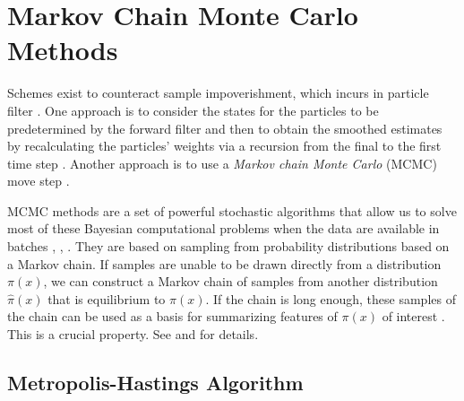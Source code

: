 \section{Markov Chain Monte Carlo Methods}


Schemes exist to counteract sample impoverishment, which incurs in particle filter \cite{ristic2004beyond}. One approach is to consider the states for the particles to be predetermined by the forward filter and then to obtain the smoothed estimates by recalculating the particles' weights via a recursion from the final to the first time step \cite{godsill2000methodology}. Another approach is to use a \textit{Markov chain Monte Carlo} (MCMC) move step \cite{carlin1992monte}.


MCMC methods are a set of powerful stochastic algorithms that allow us to solve most of these Bayesian computational problems when the data are available in batches \cite{andrieu1999sequential}, \cite{green1995reversible}, \cite{andrieu2001model}. They are based on sampling from probability distributions based on a Markov chain. If samples are unable to be drawn directly from a distribution $\pi(x)$, we can construct a Markov chain of samples from another distribution $\hat{\pi}(x)$ that is equilibrium to $\pi(x)$. If the chain is long enough, these samples of the chain can be used as a basis for summarizing features of $\pi(x)$ of interest \cite{smith1993bayesian}. This is a crucial property. See \eg \cite{cappe2009inference} and \cite{liu2008monte} for details. 




\subsection*{Metropolis-Hastings Algorithm}

